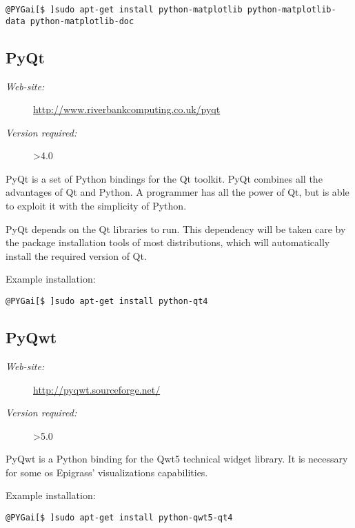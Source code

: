 \documentclass[a4paper,10pt]{manual}
\begin{document}
\begin{Verbatim}[commandchars=@\[\]]
@PYGai[$ ]sudo apt-get install python-matplotlib python-matplotlib-data python-matplotlib-doc
\end{Verbatim}


\subsection{PyQt}
\begin{description}
\item[\emph{Web-site:}]
\href{http://www.riverbankcomputing.co.uk/pyqt}{http://www.riverbankcomputing.co.uk/pyqt}

\item[\emph{Version required:}]
\textgreater{}4.0

\end{description}

PyQt is a set of Python bindings for the Qt toolkit. PyQt combines all the advantages of Qt and Python. A programmer has all the power of Qt, but is able to exploit it with the simplicity of Python.

PyQt depends on the Qt libraries to run. This dependency will be taken care by the package installation tools of most distributions, which will automatically install the required version of Qt.

Example installation:

\begin{Verbatim}[commandchars=@\[\]]
@PYGai[$ ]sudo apt-get install python-qt4
\end{Verbatim}


\subsection{PyQwt}
\begin{description}
\item[\emph{Web-site:}]
\href{http://pyqwt.sourceforge.net/}{http://pyqwt.sourceforge.net/}

\item[\emph{Version required:}]
\textgreater{}5.0

\end{description}

PyQwt is a Python binding for the Qwt5 technical widget library. It is necessary for some os Epigrass' visualizations capabilities.

Example installation:

\begin{Verbatim}[commandchars=@\[\]]
@PYGai[$ ]sudo apt-get install python-qwt5-qt4
\end{Verbatim}
\end{document}
